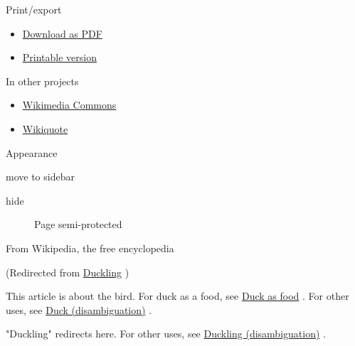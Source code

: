 \documentclass[11pt,a4paper]{article}
\begin{document}
Print/export

\begin{itemize}
\item \href{/w/index.php?title=Special:DownloadAsPdf\&page=Duck\&action=show-download-screen}{Download as PDF}
\item \href{/w/index.php?title=Duck\&printable=yes}{Printable version}
\end{itemize}

In other projects

\begin{itemize}
\item \href{https://commons.wikimedia.org/wiki/Category:Ducks}{Wikimedia Commons}
\item \href{https://en.wikiquote.org/wiki/Duck}{Wikiquote}
\end{itemize}

Appearance

move to sidebar

hide

\begin{figure}[h]
\caption{Page semi-protected}
\end{figure}

From Wikipedia, the free encyclopedia

(Redirected from \href{/w/index.php?title=Duckling\&redirect=no}{Duckling} )

This article is about the bird. For duck as a food, see \href{/wiki/Duck\_as\_food}{Duck as food} . For other uses, see \href{/wiki/Duck\_(disambiguation)}{Duck (disambiguation)} .

"Duckling" redirects here. For other uses, see \href{/wiki/Duckling\_(disambiguation)}{Duckling (disambiguation)} .
\end{document}
